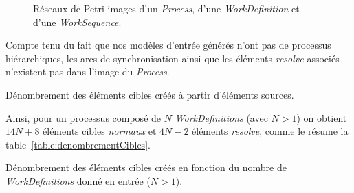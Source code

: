 \begin{figure}[!h]
  \begin{center}
    \begingroup
{}%
    \begin{subfigure}[h]{0.25\linewidth}
      
      \label{fig:rappelP2PN}
    \end{subfigure}
    \quad %
    \begin{subfigure}[h]{0.30\linewidth}
      
      \label{fig:rappelWD2PN}
    \end{subfigure}
    \quad %
    \begin{subfigure}[h]{0.35\linewidth}
      
      \label{fig:rappelWD2PN}
    \end{subfigure}
    \caption{Réseaux de Petri images d'un \emph{Process}, d'une
    \emph{WorkDefinition} et d'une \emph{WorkSequence}.}
    \label{fig:rappel2PN}
\endgroup
  \end{center}
\end{figure}

Compte tenu du fait que nos modèles d'entrée générés n'ont pas de processus
hiérarchiques, les arcs de synchronisation ainsi que les éléments
\emph{resolve} associés n'existent pas dans l'image du \emph{Process}.

\begin{table}[h]
  \begin{center}
    
    \caption{Dénombrement des éléments cibles créés à partir d'éléments
    sources.}
    \label{table:productionRules}
  \end{center}
\end{table}


Ainsi, pour un processus composé de $N$ \emph{WorkDefinitions} (avec $N > 1$)
on obtient $14N+8$ éléments cibles \emph{normaux} et $4N-2$ éléments
\emph{resolve}, comme le résume la table~\ref{table:denombrementCibles}.

\begin{table}[h]
  \begin{center}
    
    \caption{Dénombrement des éléments cibles créés en fonction du nombre de
      \emph{WorkDefinitions} donné en entrée ($N>1$).}
    \label{table:denombrementCibles}
  \end{center}
\end{table}

